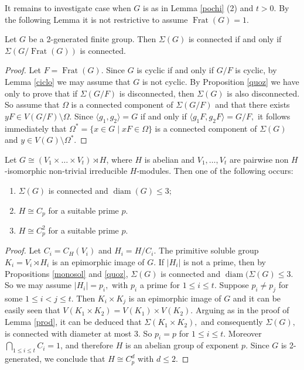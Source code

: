 \documentclass{amsart}
\DeclareMathOperator{\frat}{Frat}
\DeclareMathOperator{\diam}{diam}
\numberwithin{equation}{section}
\begin{document}
It remains to investigate case when $G$ is as in Lemma \ref{pochi} (2) and $t>0.$ By the following Lemma it is not restrictive to assume $\frat(G)=1.$
\begin{lemma}
	Let $G$ be a 2-generated finite group. Then $\Sigma(G)$ is connected if and only if $\Sigma(G/\frat(G))$ is connected.
\end{lemma}



\begin{proof}Let $F=\frat(G).$ Since $G$ is cyclic if and only if $G/F$ is cyclic, by Lemma 	\ref{ciclo} we may assume that $G$ is not cyclic. By Proposition \ref{quoz} we have only to prove that if $\Sigma(G/F)$ is disconnected, then $\Sigma(G)$ is also disconnected. So
	assume that $\Omega$ is a connected component of $\Sigma(G/F)$ and that there exists $yF \in V(G/F) \setminus \Omega.$ Since $\langle g_1, g_2 \rangle=G$ if and only if $\langle g_1F, g_2F \rangle=G/F,$ it follows immediately that $\Omega^*=\{x 	\in G\mid xF \in \Omega\}$ is a connected component of $\Sigma(G)$ and $y \in V(G) \setminus \Omega^*.$
\end{proof}



\begin{lemma}\label{restri}Let $G\cong (V_1\times \dots \times V_t)\rtimes H$,
		where $H$ is abelian and $V_1,\dots,V_t$
	are pairwise non $H$-isomorphic non-trivial irreducible $H$-modules. Then 
one of the following occurs:
\begin{enumerate}
	\item $\Sigma(G)$ is connected and $\diam(G)\leq 3;$
	\item $H \cong C_p$ for a suitable prime $p$.
	\item $H\cong C_p^2$ for a suitable prime $p.$
\end{enumerate}
\end{lemma}
\begin{proof}
Let $C_i=C_H(V_i)$ and $H_i=H/C_i.$ The primitive soluble group $K_i=V_i \rtimes H_i$ is an epimorphic image of $G$. If $|H_i|$ is not a prime, then by Propositions \ref{monosol} and \ref{quoz}, $\Sigma(G)$ is connected and $\diam(\Sigma(G)\leq 3.$ So we may assume $|H_i|=p_i,$ with $p_i$ a prime for $1\leq i\leq t.$ Suppose $p_i\neq p_j$ for some $1\leq i<j\leq t.$ Then $K_i \times K_j$ is an epimorphic image of $G$ and it can be easily seen that $V(K_1 \times K_2)=V(K_1)\times V(K_2)$. Arguing as in the proof of Lemma \ref{prod}, it can be deduced that $\Sigma(K_1\times K_2),$ and consequently $\Sigma(G),$ is connected with diameter at most 3. So $p_i=p$ for
$1\leq i \leq t.$ Moreover $\bigcap_{1\leq i\leq t}C_i=1$, and therefore $H$ is an abelian group of exponent $p.$ Since $G$ is 2-generated, we conclude that $H\cong C_p^d$ with $d\leq 2.$
\end{proof}
\end{document}
